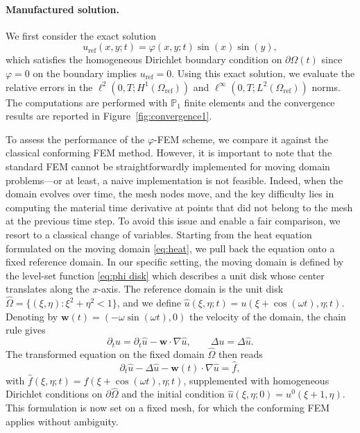 \documentclass[11pt,a4paper]{article}
\theoremstyle{plain}
\theoremstyle{definition}
\theoremstyle{remark}
\numberwithin{equation}{section}
\begin{document}
\paragraph{Manufactured solution.} We first consider the exact solution
\begin{equation}
    u_{\mathrm{ref}}(x,y;t)
    =
    \varphi(x,y;t)\sin(x)\sin(y),
    \label{Eq:manufactured solution}
\end{equation}
which satisfies the homogeneous Dirichlet boundary condition on $\partial\Omega(t)$ since $\varphi=0$ on the boundary implies $u_{\mathrm{ref}}=0$. Using this exact solution, we evaluate the relative errors in the $\ell^2(0,T;H^1(\Omega_{\mathrm{ref}}))$ and $\ell^\infty(0,T;L^2(\Omega_{\mathrm{ref}}))$ norms. The computations are performed with $\mathbb{P}_1$ finite elements and the convergence results are reported in Figure~\ref{fig:convergence1}.


To assess the performance of the $\varphi$-FEM scheme, we compare it against the classical conforming FEM method. However, it is important to note that the standard FEM cannot be straightforwardly implemented for moving domain problems---or at least, a naive implementation is not feasible. Indeed, when the domain evolves over time, the mesh nodes move, and the key difficulty lies in computing the material time derivative at points that did not belong to the mesh at the previous time step. To avoid this issue and enable a fair comparison, we resort to a classical change of variables. Starting from the heat equation formulated on the moving domain \eqref{eq:heat}, we pull back the equation onto a fixed reference domain. In our specific setting, the moving domain is defined by the level-set function \eqref{eq:phi disk} which describes a unit disk whose center translates along the $x$-axis. The reference domain is the unit disk $\hat{\Omega} = \{(\xi,\eta): \xi^2+\eta^2<1\}$, and we define $\hat{u}(\xi,\eta;t) = u(\xi + \cos(\omega t), \eta; t)$. Denoting by $\mathbf{w}(t) = (-\omega \sin(\omega t), 0)$ the velocity of the domain, the chain rule gives
\[
\partial_t u = \partial_t \hat{u} - \mathbf{w} \cdot \nabla \hat{u}, \qquad \Delta u = \Delta \hat{u}.
\]
The transformed equation on the fixed domain $\hat{\Omega}$ then reads
\[
\partial_t \hat{u} - \Delta \hat{u} - \mathbf{w}(t) \cdot \nabla \hat{u} = \hat{f},
\]
with $\hat{f}(\xi,\eta;t) = f(\xi + \cos(\omega t), \eta; t)$, supplemented with homogeneous Dirichlet conditions on $\partial\hat{\Omega}$ and the initial condition $\hat{u}(\xi,\eta;0) = {u^0}(\xi + 1, \eta)$. This formulation is now set on a fixed mesh, for which the conforming FEM applies without ambiguity.
\end{document}
